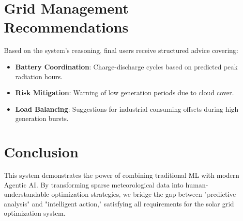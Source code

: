 \documentclass[12pt,a4paper]{article}
\begin{document}
\section{Grid Management Recommendations}
Based on the system's reasoning, final users receive structured advice covering:
\begin{itemize}
    \item \textbf{Battery Coordination}: Charge-discharge cycles based on predicted peak radiation hours.
    \item \textbf{Risk Mitigation}: Warning of low generation periods due to cloud cover.
    \item \textbf{Load Balancing}: Suggestions for industrial consuming offsets during high generation bursts.
\end{itemize}

\section{Conclusion}
This system demonstrates the power of combining traditional ML with modern Agentic AI. By transforming sparse meteorological data into human-understandable optimization strategies, we bridge the gap between "predictive analysis" and "intelligent action," satisfying all requirements for the solar grid optimization system.
\end{document}
